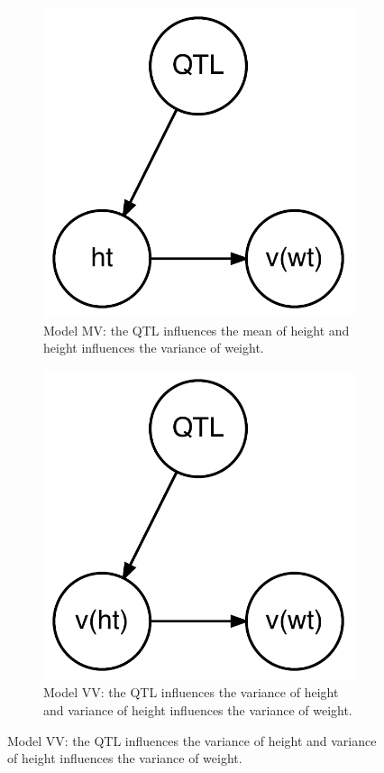 \begin{figure}
	\vspace*{3em}
	
	\begin{subfigure}{0.45\textwidth}
		\includegraphics[width=0.8\linewidth]{images/graph_mv.pdf}
		\caption{Model MV: the QTL influences the mean of height and height influences the variance of weight.}
	\end{subfigure}\qquad
	\begin{subfigure}{0.45\textwidth}
		\includegraphics[width=0.8\linewidth]{images/graph_vv.pdf}
		\caption{Model VV: the QTL influences the variance of height and variance of height influences the variance of weight.}
	\end{subfigure}
\end{figure}
